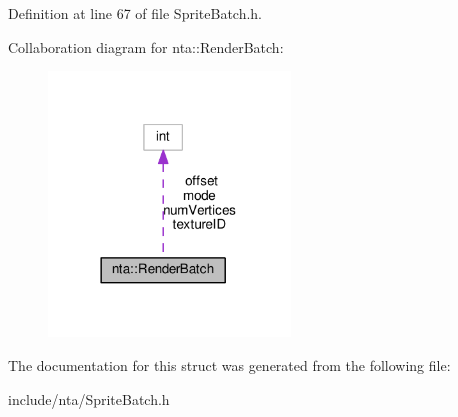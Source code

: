Definition at line 67 of file Sprite\+Batch.\+h.



Collaboration diagram for nta\+:\+:Render\+Batch\+:
\nopagebreak
\begin{figure}[H]
\begin{center}
\leavevmode
\includegraphics[width=182pt]{df/da4/structnta_1_1RenderBatch__coll__graph}
\end{center}
\end{figure}


The documentation for this struct was generated from the following file\+:\begin{DoxyCompactItemize}
\item 
include/nta/Sprite\+Batch.\+h\end{DoxyCompactItemize}
